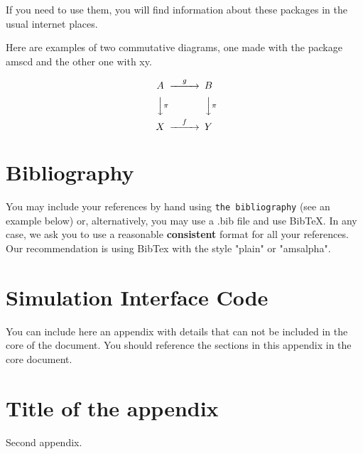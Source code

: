 \documentclass[12,twoside]{TFG-GM}
\theoremstyle{definition}
\theoremstyle{remark}
\begin{document}
If you need to use them, you will find information about these packages in the usual internet places. 

Here are examples of two commutative diagrams, one made with the package amscd and the other one with xy.

\[
\begin{CD}
A @>g>> B\\
@VV\pi V @VV\pi V\\
X @>f>> Y
\end{CD}
\]


\section{Bibliography}

You may include your references by hand using {\tt the bibliography} (see an example below) or, alternatively, you may use a .bib file and use BibTeX. In any case, we ask you to use a reasonable {\bf consistent} format for all your references. Our recommendation is using BibTex with the style   "plain" or "amsalpha".


{}


\appendix
\vfill\newpage \section{Simulation Interface Code}
\label{app:code}
You can include here an appendix with details that can not be included in the core of the document. You should reference the sections in this appendix in the core document.
\vfill\newpage \section{Title of the appendix}
Second appendix.
\end{document}
